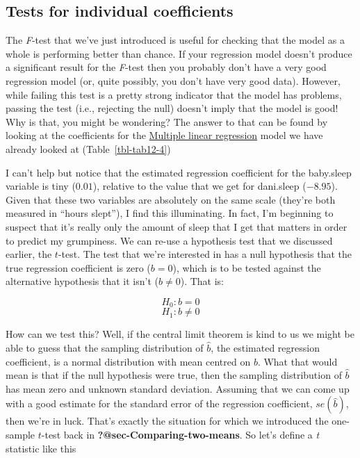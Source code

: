 \documentclass[
  a4paper,
]{book}
\begin{document}
\hypertarget{tests-for-individual-coefficients}{%
\subsection{Tests for individual
coefficients}\label{tests-for-individual-coefficients}}

The \emph{F}-test that we've just introduced is useful for checking that
the model as a whole is performing better than chance. If your
regression model doesn't produce a significant result for the
\emph{F}-test then you probably don't have a very good regression model
(or, quite possibly, you don't have very good data). However, while
failing this test is a pretty strong indicator that the model has
problems, passing the test (i.e., rejecting the null) doesn't imply that
the model is good! Why is that, you might be wondering? The answer to
that can be found by looking at the coefficients for the
\protect\hyperlink{multiple-linear-regression}{Multiple linear
regression} model we have already looked at (Table~\ref{tbl-tab12-4})

I can't help but notice that the estimated regression coefficient for
the baby.sleep variable is tiny (\(0.01\)), relative to the value that
we get for dani.sleep (\(-8.95\)). Given that these two variables are
absolutely on the same scale (they're both measured in ``hours slept''),
I find this illuminating. In fact, I'm beginning to suspect that it's
really only the amount of sleep that I get that matters in order to
predict my grumpiness. We can re-use a hypothesis test that we discussed
earlier, the \(t\)-test. The test that we're interested in has a null
hypothesis that the true regression coefficient is zero (\(b = 0\)),
which is to be tested against the alternative hypothesis that it isn't
(\(b \neq 0\)). That is:

\[H_0:b=0\] \[H_1:b \neq 0\]

How can we test this? Well, if the central limit theorem is kind to us
we might be able to guess that the sampling distribution of \(\hat{b}\),
the estimated regression coefficient, is a normal distribution with mean
centred on \(b\). What that would mean is that if the null hypothesis
were true, then the sampling distribution of \(\hat{b}\) has mean zero
and unknown standard deviation. Assuming that we can come up with a good
estimate for the standard error of the regression coefficient,
\(se(\hat{b})\), then we're in luck. That's exactly the situation for
which we introduced the one-sample \(t\)-test back in
\textbf{?@sec-Comparing-two-means}. So let's define a \emph{t} statistic
like this
\end{document}
